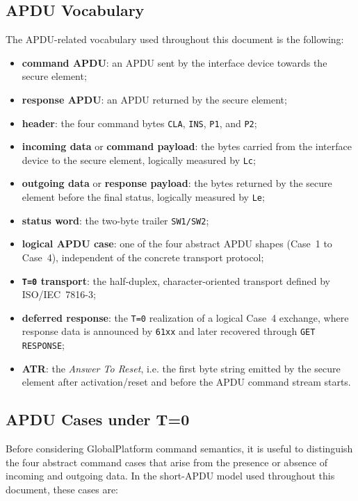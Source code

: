 \subsection{APDU Vocabulary}

The APDU-related vocabulary used throughout this document is the
following:

\begin{itemize}
\item \textbf{command APDU}: an APDU sent by the interface device
  towards the secure element;
\item \textbf{response APDU}: an APDU returned by the secure element;
\item \textbf{header}: the four command bytes \texttt{CLA},
  \texttt{INS}, \texttt{P1}, and \texttt{P2};
\item \textbf{incoming data} or \textbf{command payload}: the bytes
  carried from the interface device to the secure element, logically measured by
  \texttt{Lc};
\item \textbf{outgoing data} or \textbf{response payload}: the bytes
  returned by the secure element before the final status, logically measured by
  \texttt{Le};
\item \textbf{status word}: the two-byte trailer \texttt{SW1/SW2};
\item \textbf{logical APDU case}: one of the four abstract APDU shapes
  (Case~1 to Case~4), independent of the concrete transport protocol;
\item \textbf{\texttt{T=0} transport}: the half-duplex,
  character-oriented transport defined by ISO/IEC~7816-3;
\item \textbf{deferred response}: the \texttt{T=0} realization of a
  logical Case~4 exchange, where response data is announced by
  \texttt{61xx} and later recovered through \texttt{GET RESPONSE};
\item \textbf{ATR}: the \emph{Answer To Reset}, i.e. the first byte
  string emitted by the secure element after activation/reset and before the APDU
  command stream starts.
\end{itemize}

\subsection{APDU Cases under T=0}

Before considering GlobalPlatform command semantics, it is useful to
distinguish the four abstract command cases that arise from the presence
or absence of incoming and outgoing data. In the short-APDU model used
throughout this document, these cases are:

